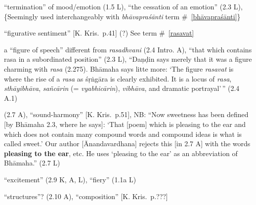 \documentclass[10pt]{article}
\begin{document}
\begin{multicols}{2}
\begin{enumerate}[
			leftmargin=0em,
			rightmargin=0em,
		]
		 ``termination'' of mood/emotion (1.5 L),
		``the cessation of an emotion'' (2.3 L),
		\{Seemingly used interchangeably with \textit{bhāvapraśānti} term \#~\ref{bhāvapraśānti}\}



		 ``figurative sentiment'' [K. Kris.\ p.41] (?)
		See term \#~\ref{rasavat}

		 a ``figure of speech'' different from \textit{rasadhvani} (2.4 Intro. A),
		``that which contains rasa in a subordinated position'' (2.3 L),
		``Daṇḍin says merely that it was a figure charming with \textit{rasa} (2.275).
		Bhāmaha says litte more: `The figure \textit{rasavat} is where the rise of a \textit{rasa} as śṛṅgāra is clearly exhibited. It is a locus of \textit{rasa}, \textit{sthāyibhāva}, \textit{sañcārin} (= \textit{vyabhicārin}), \textit{vibhāva}, and dramatic portrayal'\,'' (2.4 A.1)%



		 (2.7 A),
		``sound-harmony'' [K. Kris.\ p.51],
		NB: ``Now sweetness has been defined [by Bhāmaha 2.3, where he says]:
		`That [poem] which is pleasing to the ear and which does not contain many compound words and compound ideas is what is called sweet.'
		Our author [Ānandavardhana] rejects this [in 2.7 A] with the words \textbf{pleasing to the ear}, etc.
		He uses `pleasing to the ear' as an abbreviation of Bhāmaha.'' (2.7 L)

		 ``excitement'' (2.9 K, A, L), ``fiery'' (1.1a L)

		 ``structures''? (2.10 A), ``composition'' [K. Kris.\ p.???]




\end{enumerate}
\end{multicols}
\end{document}
